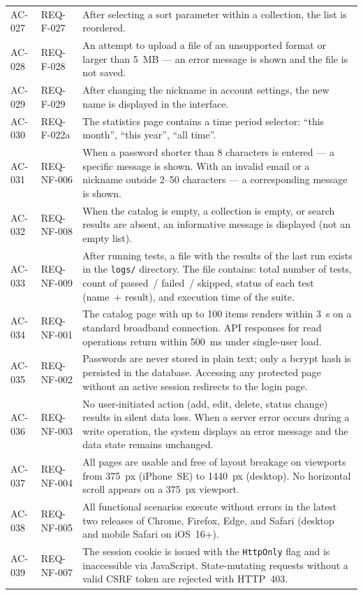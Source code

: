 \begin{longtable}{L{2cm} L{2.5cm} L{9.5cm}}
\addlinespace
AC-027 & REQ-F-027 & After selecting a sort parameter within a collection, the list is reordered.  \\
\addlinespace
AC-028 & REQ-F-028 & An attempt to upload a file of an unsupported format or larger than 5~MB --- an error message is shown and the file is not saved.  \\
\addlinespace
AC-029 & REQ-F-029 & After changing the nickname in account settings, the new name is displayed in the interface.  \\
\addlinespace
AC-030 & REQ-F-022a & The statistics page contains a time period selector: ``this month'', ``this year'', ``all time''.  \\
\addlinespace
AC-031 & REQ-NF-006 & When a password shorter than 8 characters is entered --- a specific message is shown. With an invalid email or a nickname outside 2--50 characters --- a corresponding message is shown.  \\
\addlinespace
AC-032 & REQ-NF-008 & When the catalog is empty, a collection is empty, or search results are absent, an informative message is displayed (not an empty list).  \\
\addlinespace
AC-033 & REQ-NF-009 & After running tests, a file with the results of the last run exists in the \texttt{logs/} directory. The file contains: total number of tests, count of passed~/ failed~/ skipped, status of each test (name~+ result), and execution time of the suite.  \\
\addlinespace
AC-034 & REQ-NF-001 & The catalog page with up to 100 items renders within 3~s on a standard broadband connection. API responses for read operations return within 500~ms under single-user load. \\
\addlinespace
AC-035 & REQ-NF-002 & Passwords are never stored in plain text; only a bcrypt hash is persisted in the database. Accessing any protected page without an active session redirects to the login page. \\
\addlinespace
AC-036 & REQ-NF-003 & No user-initiated action (add, edit, delete, status change) results in silent data loss. When a server error occurs during a write operation, the system displays an error message and the data state remains unchanged. \\
\addlinespace
AC-037 & REQ-NF-004 & All pages are usable and free of layout breakage on viewports from 375~px (iPhone~SE) to 1440~px (desktop). No horizontal scroll appears on a 375~px viewport. \\
\addlinespace
AC-038 & REQ-NF-005 & All functional scenarios execute without errors in the latest two releases of Chrome, Firefox, Edge, and Safari (desktop and mobile Safari on iOS~16+). \\
\addlinespace
AC-039 & REQ-NF-007 & The session cookie is issued with the \texttt{HttpOnly} flag and is inaccessible via JavaScript. State-mutating requests without a valid CSRF token are rejected with HTTP~403. \\

\end{longtable}

